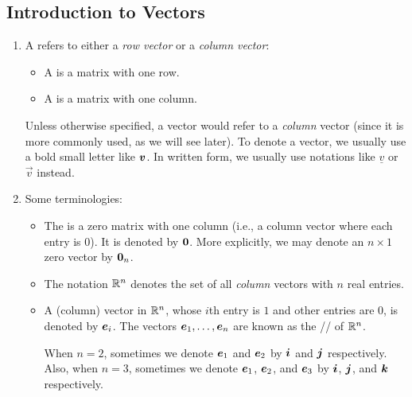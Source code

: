 \subsection{Introduction to Vectors}
\begin{enumerate}
\item A  refers to either a \emph{row vector} or a \emph{column
vector}:
\begin{itemize}
\item A  is a matrix with one row.
\item A  is a matrix with one column.
\end{itemize}
Unless otherwise specified, a vector would refer to a \emph{column} vector
(since it is more commonly used, as we will see later). To denote a vector, we
usually use a bold small letter like \(\vb*{v}\). In written form, we usually
use notations like \(\underline{v}\) or \(\vec{v}\) instead.

\item Some terminologies:
\begin{itemize}
\item The  is a zero matrix with one column (i.e., a column
vector where each entry is \(0\)). It is denoted by \(\vb*{0}\). More explicitly, we may denote an \(n\times 1\) zero vector by \(\vb*{0}_{n}\).
\item The notation \(\mathbb{R}^n\) denotes the set of all \emph{column} vectors with \(n\)
real entries.
\item A (column) vector in \(\mathbb{R}^n\), whose \(i\)th entry is \(1\) and other
entries are \(0\), is denoted by \(\vb*{e}_{i}\). The vectors
\(\vb*{e}_{1},\dotsc,\vb*{e}_{n}\) are known as the // of
\(\mathbb{R}^n\).

\begin{note}
When \(n=2\), sometimes we denote \(\vb*{e}_{1}\) and \(\vb*{e}_{2}\) by
\(\vb*{i}\) and \(\vb*{j}\) respectively. Also, when \(n=3\), sometimes we
denote \(\vb*{e}_{1}\), \(\vb*{e}_{2}\), and \(\vb*{e}_{3}\) by
\(\vb*{i}\), \(\vb*{j}\), and \(\vb*{k}\) respectively.
\end{note}
\end{itemize}


\end{enumerate}

